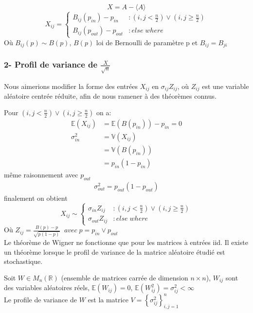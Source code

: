\begin{equation}
X = A - \langle A \rangle\nonumber
\end{equation}
\begin{equation}
	X_{ij}  = \left\{
	\begin{array}{lr}
		B_{ij}(p_{in}) - p_{in} & : (i,j < \frac{n}{2}) \lor (i,j \ge \frac{n}{2}) \\
		B_{ij}(p_{out}) - p_{out} & : else \; where
	\end{array}
\right.\nonumber
\end{equation}
Où $B_{ij}(p) \sim B(p)$, $B(p)$ loi de Bernoulli de paramètre p et $B_{ij} = B_{ji}$\\


\subsubsection*{2- Profil de variance de $\frac{X}{\sqrt{n}}$}
Nous aimerions modifier la forme des entrées $X_{ij}$ en $\sigma_{ij} Z_{ij}$, où $Z_{ij}$ est une variable aléatoire centrée réduite, afin de nous ramener à des théorèmes connus.

Pour $(i,j < \frac{n}{2}) \lor (i,j \ge \frac{n}{2}) $ on a:
\begin{align*}
\mathbb{E}(X_{ij}) &= \mathbb{E}(B(p_{in}))- p_{in} = 0\\
\sigma_{in}^2 &= \mathbb{V}(X_{ij}) \\ 
			  &= \mathbb{V}(B(p_{in})) \\
			  &= p_{in} (1 - p_{in})
\end{align*}
même raisonnement avec $p_{out}$ 
\begin{align*}
\sigma_{out}^2 =  p_{out} (1 - p_{out})
\end{align*}
finalement on obtient 
\begin{equation}
	X_{ij} \sim \left\{
	\begin{array}{lr}
		\sigma_{in} Z_{ij} & : (i,j < \frac{n}{2}) \lor (i,j \ge \frac{n}{2}) \\
		\sigma_{out} Z_{ij} & : else \; where
	\end{array}
\right.\nonumber
\end{equation}
Où $Z_{ij} = \frac{B(p) - p}{\sqrt{p(1-p)}} \;\;avec \; p = p_{in} \lor p_{out}$\\

Le théorème de Wigner ne fonctionne que pour les matrices à entrées iid. 
Il existe un théorème lorsque le profil de variance de la matrice aléatoire étudié est stochastique.
\begin{mydef}
Soit $W \in M_{n}(\mathbb{R})$ (ensemble de matrices carrée de dimension $n \times n$), $W_{ij}$ sont des variables aléatoires réels, $\mathbb{E}(W_{ij}) = 0$, $\mathbb{E}(W_{ij}^2) = \sigma_{ij}^2< \infty$\\

Le profile de variance de $W$ est la matrice $V=\left\{ \sigma_{ij}^2 \right\}_{i,j=1}^n$
\end{mydef}

